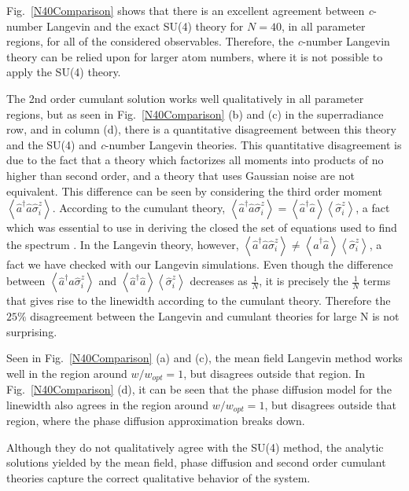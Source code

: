\documentclass[aps,
twocolumn,
superscriptaddress,groupedaddress]{revtex4}
\begin{document}
Fig.~\ref{N40Comparison} shows that there is an excellent agreement
between {\it c}-number Langevin and the exact SU(4) theory for $N=40$, in all
parameter regions, for all of the considered observables. Therefore, the
{\it c}-number Langevin theory can be relied upon for larger atom numbers,
where it is not possible to apply the SU(4) theory.

The 2nd order cumulant solution works well qualitatively in all
parameter regions, but as seen in Fig.~\ref{N40Comparison} (b) and (c)
in the superradiance row, and in column (d), there is a quantitative
disagreement between this theory and the SU(4) and {\it c}-number Langevin
theories. This quantitative disagreement is due to the fact that a theory which factorizes all moments
into products of no higher than second order, and a theory that
uses Gaussian noise are not equivalent. This difference can be seen by considering the
third order moment $\left< \hat{a}^{\dagger}\hat{a}\hat{\sigma}_i^z
\right>$. According to the cumulant theory, $\left<
\hat{a}^{\dagger}\hat{a}\hat{\sigma}_i^z \right>=\left<
\hat{a}^{\dagger}\hat{a}\right> \left<\hat{\sigma}_i^z \right>$, a fact
which was essential to use in deriving the closed the set of equations
used to find the spectrum \cite{PhysRevLett.102.163601}. In the Langevin
theory, however, $\left< \hat{a}^{\dagger}\hat{a}\hat{\sigma}_i^z
\right> \neq \left< \hat{a}^{\dagger}\hat{a}\right>
\left<\hat{\sigma}_i^z \right>$, a fact we have checked with our
Langevin simulations. Even though the difference between $\left<
\hat{a}^{\dagger}\hat{a}\hat{\sigma}_i^z \right>$ and $\left<
\hat{a}^{\dagger}\hat{a}\right> \left<\hat{\sigma}_i^z \right>$
decreases as $\frac{1}{N}$, it is precisely the $\frac{1}{N}$ terms that
gives rise to the linewidth according to the cumulant theory.  Therefore
the $25\%$ disagreement between the Langevin and cumulant theories for
large N is not surprising.

Seen in Fig.~\ref{N40Comparison} (a) and (c), the mean field Langevin method
works well in the region around $w/w_{opt}=1$, but disagrees outside that region. In Fig.~\ref{N40Comparison} (d),
it can be seen that the phase diffusion model for the linewidth also agrees in the region around $w/w_{opt}=1$, but disagrees outside that region, where the phase diffusion approximation breaks down. 

Although they do not qualitatively agree with the SU(4) method, the analytic solutions yielded by the mean field, phase diffusion and second order cumulant theories capture the correct qualitative behavior of the system.
\end{document}

